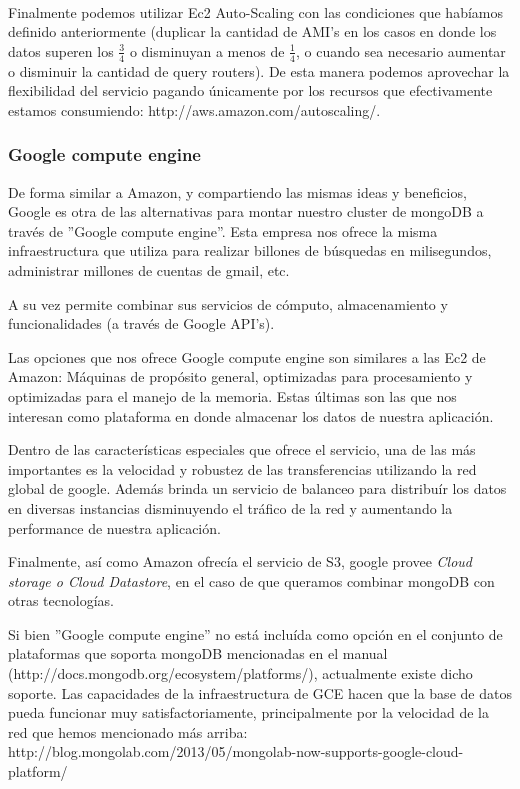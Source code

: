 ~

Finalmente podemos utilizar Ec2 Auto-Scaling con las condiciones que habíamos definido anteriormente (duplicar
la cantidad de AMI's en los casos en donde los datos superen los $\frac{3}{4}$ o disminuyan a menos de $\frac{1}{4}$,
o cuando sea necesario aumentar o disminuir la cantidad de query routers). De esta manera podemos aprovechar la 
flexibilidad del servicio pagando únicamente por los recursos que efectivamente estamos consumiendo:
http://aws.amazon.com/autoscaling/.


\subsubsection{Google compute engine}

De forma similar a Amazon, y compartiendo las mismas ideas y beneficios, Google es otra de las alternativas para 
montar nuestro cluster de mongoDB a través de ''Google compute engine''. Esta empresa nos ofrece la misma 
infraestructura que utiliza para realizar billones de búsquedas en milisegundos, administrar millones de cuentas
de gmail, etc. 

A su vez permite combinar sus servicios de cómputo, almacenamiento y funcionalidades (a través de Google API's).

Las opciones que nos ofrece Google compute engine son similares a las Ec2 de Amazon: Máquinas de propósito general,
optimizadas para procesamiento y optimizadas para el manejo de la memoria. Estas últimas son las que nos interesan
como plataforma en donde almacenar los datos de nuestra aplicación.

Dentro de las características especiales que ofrece el servicio, una de las más importantes es la velocidad y robustez
de las transferencias utilizando la red global de google. Además brinda un servicio de balanceo para distribuír los 
datos en diversas instancias disminuyendo el tráfico de la red y aumentando la performance de nuestra aplicación.

Finalmente, así como Amazon ofrecía el servicio de S3, google provee \emph{Cloud storage o Cloud Datastore}, en el
caso de que queramos combinar mongoDB con otras tecnologías. 

Si bien ''Google compute engine'' no está incluída como opción en el conjunto de plataformas que soporta mongoDB 
mencionadas en el manual (http://docs.mongodb.org/ecosystem/platforms/), actualmente existe dicho soporte. 
Las capacidades de la infraestructura de GCE hacen que la base de datos pueda funcionar muy satisfactoriamente, 
principalmente por la velocidad de la red que hemos mencionado más arriba:
http://blog.mongolab.com/2013/05/mongolab-now-supports-google-cloud-platform/

